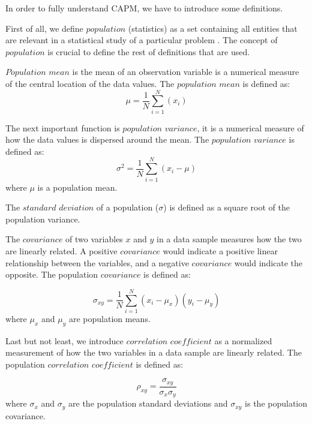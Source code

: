 In order to fully understand CAPM, we have to introduce some definitions.

First of all, we define $population$ (statistics) as a set containing all entities that are relevant in a statistical study of a particular problem \cite{Oxford}.
The concept of $population$ is crucial to define the rest of definitions that are used.

$Population$ $mean$ is the mean of an observation variable is a numerical measure of the central location of the data values.
	The $population$ $mean$ is defined as:
	 \begin{equation}
			\mu = \frac{1}{N} \sum_{i=1}^{N}{(x_{i})} 
		      \end{equation}

The next important function is $population$ $variance$, it is a numerical measure of how the data values is dispersed around the mean.
	The $population$ $variance$ is defined as:  
	      \begin{equation}
			\sigma^2 = \frac{1}{N} \sum_{i=1}^{N}{(x_{i} - \mu)} 
		      \end{equation}
	where $\mu$ is a population mean.

The $standard$ $deviation$ of a population ($\sigma$) is defined as a square root of the population variance.
	
The $covariance$ of two variables $x$ and $y$ in a data sample measures how the two are linearly related.
	A positive $covariance$ would indicate a positive linear relationship between the variables, and a negative $covariance$ would indicate the opposite. 
	The population $covariance$ is defined as:

	\begin{equation}
			\sigma_{xy} = \frac{1}{N} \sum_{i=1}^{N}{(x_{i} - \mu_{x})(y_{i} - \mu_{y})} 
		      \end{equation}
	where $\mu_{x}$ and $\mu_{y}$ are population means.

Last but not least, we introduce $correlation$ $coefficient$ as a normalized measurement of how the two variables in a data sample are linearly related.
	The population $correlation$ $coefficient$ is defined as:

	\begin{equation}
	  \rho_{xy} = \frac{\sigma_{xy}}{\sigma_{x} \sigma_{y}}
	\end{equation}
	where $\sigma_{x}$ and $\sigma_{y}$ are the population standard deviations and $\sigma_{xy}$ is the population covariance.
	

